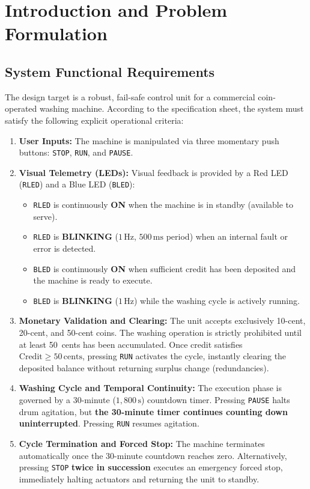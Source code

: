 \documentclass[12pt]{article}
\begin{document}
\section{Introduction and Problem Formulation}

\subsection{System Functional Requirements}
The design target is a robust, fail-safe control unit for a commercial coin-operated washing machine. According to the specification sheet, the system must satisfy the following explicit operational criteria:
\begin{enumerate}[label=\textbf{R\arabic*.}]
    \item \textbf{User Inputs:} The machine is manipulated via three momentary push buttons: \texttt{STOP}, \texttt{RUN}, and \texttt{PAUSE}.
    \item \textbf{Visual Telemetry (LEDs):} Visual feedback is provided by a Red LED (\texttt{RLED}) and a Blue LED (\texttt{BLED}):
    \begin{itemize}
        \item \texttt{RLED} is continuously \textbf{ON} when the machine is in standby (available to serve).
        \item \texttt{RLED} is \textbf{BLINKING} ($1\,\text{Hz}$, $500\,\text{ms}$ period) when an internal fault or error is detected.
        \item \texttt{BLED} is continuously \textbf{ON} when sufficient credit has been deposited and the machine is ready to execute.
        \item \texttt{BLED} is \textbf{BLINKING} ($1\,\text{Hz}$) while the washing cycle is actively running.
    \end{itemize}
    \item \textbf{Monetary Validation and Clearing:} The unit accepts exclusively 10-cent, 20-cent, and 50-cent coins. The washing operation is strictly prohibited until at least 50~cents has been accumulated. Once credit satisfies $\text{Credit} \ge 50\,\text{cents}$, pressing \texttt{RUN} activates the cycle, instantly clearing the deposited balance without returning surplus change (redundancies).
    \item \textbf{Washing Cycle and Temporal Continuity:} The execution phase is governed by a 30-minute ($1{,}800\,\text{s}$) countdown timer. Pressing \texttt{PAUSE} halts drum agitation, but \textbf{the 30-minute timer continues counting down uninterrupted}. Pressing \texttt{RUN} resumes agitation.
    \item \textbf{Cycle Termination and Forced Stop:} The machine terminates automatically once the 30-minute countdown reaches zero. Alternatively, pressing \texttt{STOP} \textbf{twice in succession} executes an emergency forced stop, immediately halting actuators and returning the unit to standby.
\end{enumerate}
\end{document}
